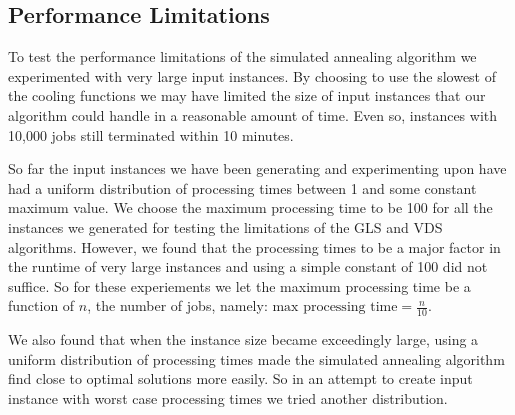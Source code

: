 \documentclass[12pt,a4paper,reqno]{article}
\begin{document}
\subsection*{Performance Limitations}
To test the performance limitations of the simulated annealing algorithm we experimented with very large input instances. By choosing to use the slowest of the cooling functions we may have limited the size of input instances that our algorithm could handle in a reasonable amount of time. Even so, instances with 10,000 jobs still terminated within 10 minutes.

So far the input instances we have been generating and experimenting upon have had a uniform distribution of processing times between 1 and some constant maximum value. We choose the maximum processing time to be 100 for all the instances we generated for testing the limitations of the GLS and VDS algorithms. However, we found that the processing times to be a major factor in the runtime of very large instances and using a simple constant of 100 did not suffice. So for these experiements we let the maximum processing time be a function of $n$, the number of jobs, namely: $\text{max processing time}=\frac{n}{10}$.

We also found that when the instance size became exceedingly large, using a uniform distribution of processing times made the simulated annealing algorithm find close to optimal solutions more easily. So in an attempt to create input instance with worst case processing times we tried another distribution.
\end{document}

